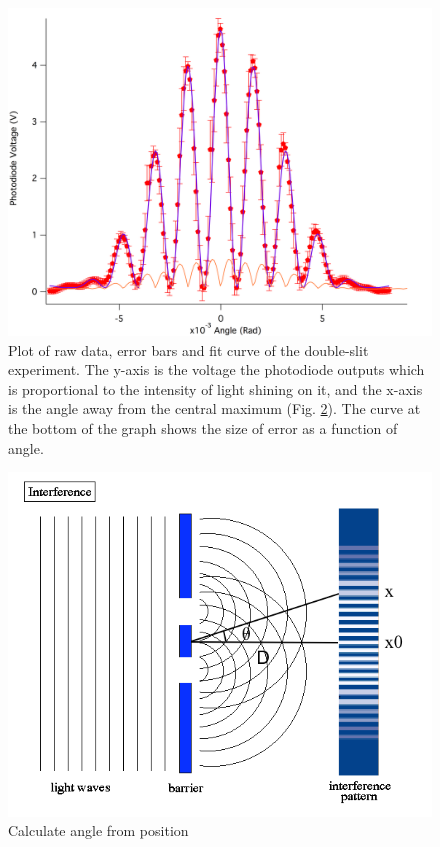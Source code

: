 \documentclass[prb,preprint]{revtex4-1}
\begin{document}
\begin{figure}[h]
\centering
\includegraphics[width=7in]{double.png}
\caption{Plot of raw data, error bars and fit curve of the double-slit experiment. The y-axis is the voltage the photodiode outputs which is proportional to the intensity of light shining on it, and the x-axis is the angle away from the central maximum (Fig. \ref{interference}). The curve at the bottom of the graph shows the size of error as a function of angle.}
\label{double}
\end{figure}

\begin{figure}[h]
\centering
\includegraphics[width=5in]{interference.png}
\caption{Calculate angle from position \cite{interference}}
\label{interference}
\end{figure}
\end{document}

